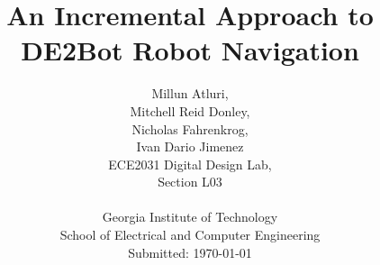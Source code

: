 \documentclass[11pt,conference,onecolumn]{article} %
\begin{document}
\title{\vspace*{30mm}
An Incremental Approach to DE2Bot Robot Navigation}

\author{
Millun Atluri,\\
Mitchell Reid Donley,\\
Nicholas Fahrenkrog,\\
Ivan Dario Jimenez
\vspace*{30mm}\\
ECE2031 Digital Design Lab,\\
Section L03\\
\vspace*{30mm}\\
Georgia Institute of Technology\\
School of Electrical and Computer Engineering\\
Submitted: \today
}

\clearpage\maketitle

\end{document}
